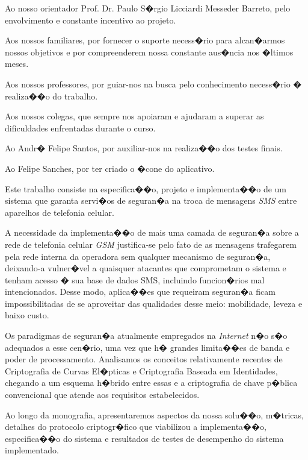 \documentclass[a4paper,capchap,espacoduplo,normaltoc]{abntepusp}
\begin{document}

\paginadedicatoria{}

\begin{agradecimentos}
Ao nosso orientador Prof. Dr. Paulo S�rgio Licciardi Messeder Barreto, pelo envolvimento e constante incentivo ao projeto.

Aos nossos familiares, por fornecer o suporte necess�rio para alcan�armos nossos objetivos e por compreenderem nossa constante aus�ncia nos �ltimos meses.

Aos nossos professores, por guiar-nos na busca pelo conhecimento necess�rio � realiza��o do trabalho.

Aos nossos colegas, que sempre nos apoiaram e ajudaram a superar as dificuldades enfrentadas durante o curso.

Ao Andr� Felipe Santos, por auxiliar-nos na realiza��o dos testes finais.

Ao Felipe Sanches, por ter criado o �cone do aplicativo.

\end{agradecimentos}

\begin{resumo}
Este trabalho consiste na especifica��o, projeto e implementa��o de um sistema que garanta servi�os de seguran�a na troca de mensagens \emph{SMS} entre aparelhos de telefonia celular. 

A necessidade da implementa��o de mais uma camada de seguran�a sobre a rede de telefonia celular \emph{GSM} justifica-se pelo fato de as mensagens trafegarem pela rede interna da operadora sem qualquer mecanismo de seguran�a, deixando-a vulner�vel a quaisquer atacantes que comprometam o sistema e tenham acesso � sua base de dados SMS, incluindo funcion�rios mal intencionados. Desse modo, aplica��es que requeiram seguran�a ficam impossibilitadas de se aproveitar das qualidades desse meio: mobilidade, leveza e baixo custo.

Os paradigmas de seguran�a atualmente empregados na \emph{Internet} n�o s�o adequados a esse cen�rio, uma vez que h� grandes limita��es de banda e poder de processamento. Analisamos os conceitos relativamente recentes de Criptografia de Curvas El�pticas e Criptografia Baseada em Identidades, chegando a um esquema h�brido entre essas e a criptografia de chave p�blica convencional que atende aos requisitos estabelecidos.

Ao longo da monografia, apresentaremos aspectos da nossa solu��o, m�tricas, detalhes do protocolo criptogr�fico que viabilizou a implementa��o, especifica��o do sistema e resultados de testes de desempenho do sistema implementado.
\end{resumo}
\end{document}

